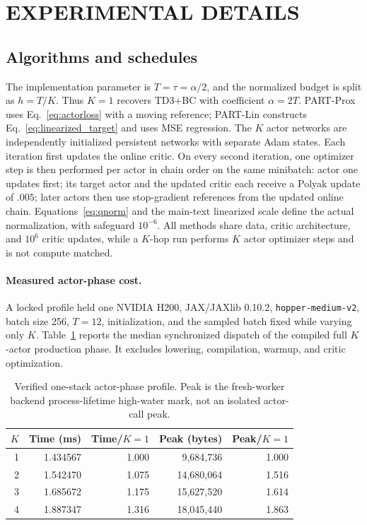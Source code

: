 \documentclass[twoside]{article}
\begin{document}
\section{EXPERIMENTAL DETAILS}
\label{app:experiments}

\subsection{Algorithms and schedules}
The implementation parameter is $T=\tau=\alpha/2$, and the normalized
budget is split as $h=T/K$. Thus $K=1$ recovers TD3+BC with coefficient
$\alpha=2T$. PART-Prox uses Eq.~\eqref{eq:actorloss} with a moving reference;
PART-Lin constructs Eq.~\eqref{eq:linearized_target} and uses MSE regression.
The $K$ actor networks are independently initialized persistent networks with
separate Adam states. Each iteration first updates the online critic. On every second iteration,
one optimizer step is then performed per actor in chain order on the same
minibatch: actor one updates first; its target actor and the updated critic each
receive a Polyak update of $.005$; later actors then use stop-gradient
references from the updated online chain. Equations~\eqref{eq:qnorm} and the main-text linearized scale define the
actual normalization, with safeguard $10^{-6}$. All methods share data, critic
architecture, and $10^6$ critic updates, while a $K$-hop run performs $K$ actor
optimizer steps and is not compute matched.

\paragraph{Measured actor-phase cost.}
A locked profile held one NVIDIA H200, JAX/JAXlib 0.10.2,
\texttt{hopper-medium-v2}, batch size 256, $T=12$, initialization, and the
sampled batch fixed while varying only $K$. Table~\ref{tab:actor_cost} reports
the median synchronized dispatch of the compiled full $K$-actor production
phase. It excludes lowering, compilation, warmup, and critic optimization.

\begin{table}[t]
\caption{Verified one-stack actor-phase profile. Peak is the fresh-worker
backend process-lifetime high-water mark, not an isolated actor-call peak.}
\centering
\small
\begin{tabular}{@{}rrrrr@{}}
\toprule
$K$ & Time (ms) & Time/$K{=}1$ & Peak (bytes) & Peak/$K{=}1$\\
\midrule
1 & 1.434567 & 1.000 & 9,684,736 & 1.000\\
2 & 1.542470 & 1.075 & 14,680,064 & 1.516\\
3 & 1.685672 & 1.175 & 15,627,520 & 1.614\\
4 & 1.887347 & 1.316 & 18,045,440 & 1.863\\
\bottomrule
\end{tabular}
\label{tab:actor_cost}
\end{table}
\end{document}
